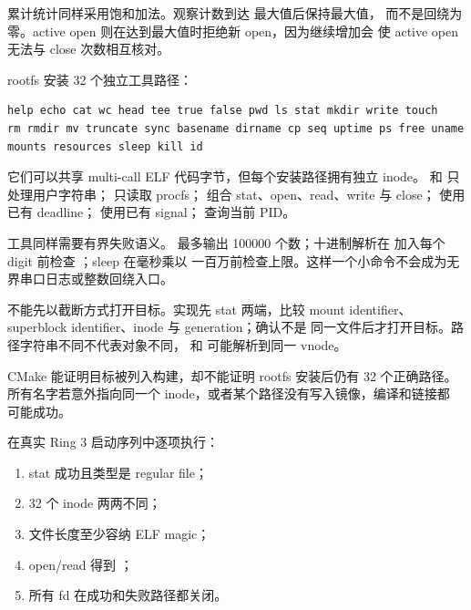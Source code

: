 累计统计同样采用饱和加法。观察计数到达  最大值后保持最大值，
而不是回绕为零。active open 则在达到最大值时拒绝新 open，因为继续增加会
使 active open 无法与 close 次数相互核对。

rootfs 安装 32 个独立工具路径：

\begin{lstlisting}[caption={rootfs 中安装的用户工具}]
help echo cat wc head tee true false pwd ls stat mkdir write touch
rm rmdir mv truncate sync basename dirname cp seq uptime ps free uname
mounts resources sleep kill id
\end{lstlisting}

它们可以共享 multi-call ELF 代码字节，但每个安装路径拥有独立 inode。
 和  只处理用户字符串；
 只读取 procfs；
 组合 stat、open、read、write 与 close； 使用已有
deadline； 使用已有 signal； 查询当前 PID。

工具同样需要有界失败语义。 最多输出 100000 个数；十进制解析在
加入每个 digit 前检查 ；sleep 在毫秒乘以
一百万前检查上限。这样一个小命令不会成为无界串口日志或整数回绕入口。

\begin{failurebox}
 不能先以截断方式打开目标。实现先 stat 两端，比较
mount identifier、superblock identifier、inode 与 generation；确认不是
同一文件后才打开目标。路径字符串不同不代表对象不同，
和  可能解析到同一 vnode。
\end{failurebox}

CMake 能证明目标被列入构建，却不能证明 rootfs 安装后仍有 32 个正确路径。
所有名字若意外指向同一个 inode，或者某个路径没有写入镜像，编译和链接都
可能成功。

 在真实 Ring 3 启动序列中逐项执行：

\begin{enumerate}[leftmargin=2.1em]
  \item stat 成功且类型是 regular file；
  \item 32 个 inode 两两不同；
  \item 文件长度至少容纳 ELF magic；
  \item open/read 得到 ；
  \item 所有 fd 在成功和失败路径都关闭。
\end{enumerate}

